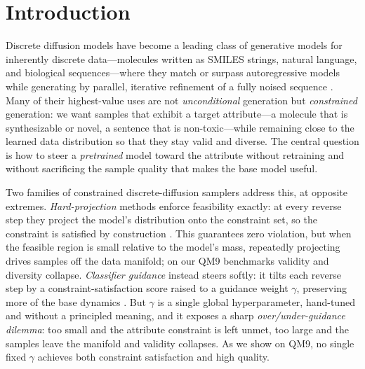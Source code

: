 \documentclass{article}
\begin{document}
\section{Introduction}
Discrete diffusion models have become a leading class of generative models for inherently discrete data---molecules written as SMILES strings, natural language, and biological sequences---where they match or surpass autoregressive models while generating by parallel, iterative refinement of a fully noised sequence \cite{austin2021d3pm,lou2024sedd,sahoo2024mdlm}. Many of their highest-value uses are not \emph{unconditional} generation but \emph{constrained} generation: we want samples that exhibit a target attribute---a molecule that is synthesizable or novel, a sentence that is non-toxic---while remaining close to the learned data distribution so that they stay valid and diverse. The central question is how to steer a \emph{pretrained} model toward the attribute without retraining and without sacrificing the sample quality that makes the base model useful.

Two families of constrained discrete-diffusion samplers address this, at opposite extremes. \emph{Hard-projection} methods enforce feasibility exactly: at every reverse step they project the model's distribution onto the constraint set, so the constraint is satisfied by construction \cite{cardei2025cdd}. This guarantees zero violation, but when the feasible region is small relative to the model's mass, repeatedly projecting drives samples off the data manifold; on our QM9 benchmarks validity and diversity collapse. \emph{Classifier guidance} instead steers softly: it tilts each reverse step by a constraint-satisfaction score raised to a guidance weight $\gamma$, preserving more of the base dynamics \cite{dhariwal2021guidance,nisonoff2024discreteguidance}. But $\gamma$ is a single global hyperparameter, hand-tuned and without a principled meaning, and it exposes a sharp \emph{over/under-guidance dilemma}: too small and the attribute constraint is left unmet, too large and the samples leave the manifold and validity collapses. As we show on QM9, no single fixed $\gamma$ achieves both constraint satisfaction and high quality.
\end{document}
